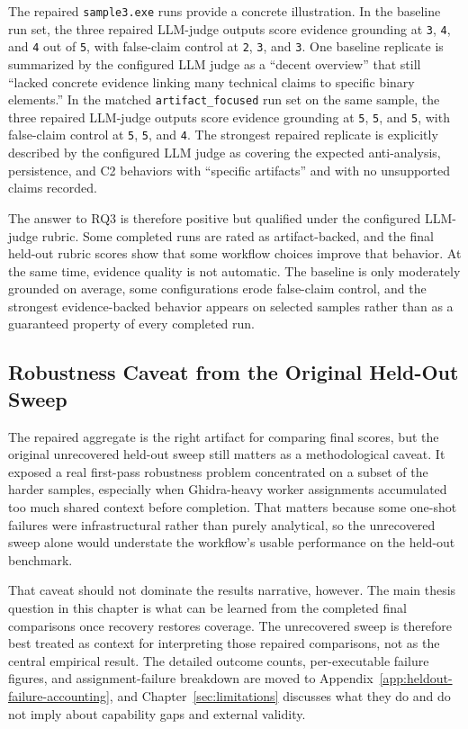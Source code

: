 The repaired \texttt{sample3.exe} runs provide a concrete illustration. In the baseline run set, the three repaired LLM-judge outputs score evidence grounding at \texttt{3}, \texttt{4}, and \texttt{4} out of \texttt{5}, with false-claim control at \texttt{2}, \texttt{3}, and \texttt{3}. One baseline replicate is summarized by the configured LLM judge as a ``decent overview'' that still ``lacked concrete evidence linking many technical claims to specific binary elements.'' In the matched \texttt{artifact\_focused} run set on the same sample, the three repaired LLM-judge outputs score evidence grounding at \texttt{5}, \texttt{5}, and \texttt{5}, with false-claim control at \texttt{5}, \texttt{5}, and \texttt{4}. The strongest repaired replicate is explicitly described by the configured LLM judge as covering the expected anti-analysis, persistence, and C2 behaviors with ``specific artifacts'' and with no unsupported claims recorded.

The answer to RQ3 is therefore positive but qualified under the configured LLM-judge rubric. Some completed runs are rated as artifact-backed, and the final held-out rubric scores show that some workflow choices improve that behavior. At the same time, evidence quality is not automatic. The baseline is only moderately grounded on average, some configurations erode false-claim control, and the strongest evidence-backed behavior appears on selected samples rather than as a guaranteed property of every completed run.

\subsection{Robustness Caveat from the Original Held-Out Sweep}
\label{sec:final-failure-analysis}

The repaired aggregate is the right artifact for comparing final scores, but the original unrecovered held-out sweep still matters as a methodological caveat. It exposed a real first-pass robustness problem concentrated on a subset of the harder samples, especially when Ghidra-heavy worker assignments accumulated too much shared context before completion. That matters because some one-shot failures were infrastructural rather than purely analytical, so the unrecovered sweep alone would understate the workflow's usable performance on the held-out benchmark.

That caveat should not dominate the results narrative, however. The main thesis question in this chapter is what can be learned from the completed final comparisons once recovery restores coverage. The unrecovered sweep is therefore best treated as context for interpreting those repaired comparisons, not as the central empirical result. The detailed outcome counts, per-executable failure figures, and assignment-failure breakdown are moved to Appendix~\ref{app:heldout-failure-accounting}, and Chapter~\ref{sec:limitations} discusses what they do and do not imply about capability gaps and external validity.

